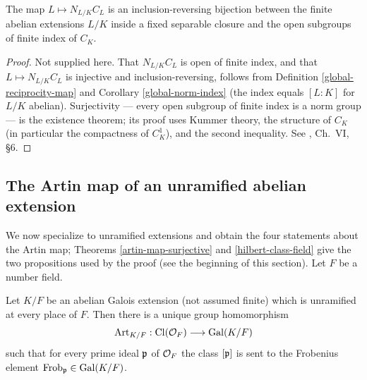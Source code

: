 \begin{thm}
\label{existence-theorem}
The map $L\mapsto N_{L/K}C_L$ is an inclusion-reversing bijection between the
finite abelian extensions $L/K$ inside a fixed separable closure and the open
subgroups of finite index of $C_K$.
\end{thm}

\begin{proof}
Not supplied here.
That $N_{L/K}C_L$ is open of finite index, and that $L\mapsto N_{L/K}C_L$ is
injective and inclusion-reversing, follows from
Definition \ref{global-reciprocity-map} and Corollary \ref{global-norm-index}
(the index equals $[L:K]$ for $L/K$ abelian).
Surjectivity --- every open subgroup of finite index is a norm group --- is the
existence theorem; its proof uses Kummer theory, the structure of $C_K$ (in
particular the compactness of $C_K^1$), and the second inequality.
See \cite{Neu99}, Ch.~VI, \S6.
\end{proof}

\subsection{The Artin map of an unramified abelian extension}

We now specialize to unramified extensions and obtain the four statements
about the Artin map; Theorems \ref{artin-map-surjective} and
\ref{hilbert-class-field} give the two propositions used by the {\Lean} proof
(see the beginning of this section).
Let $F$ be a number field.

\begin{thm}
\label{artin-map}
Let $K/F$ be an abelian Galois extension (not assumed finite) which is
unramified at every place of $F$.
Then there is a unique group homomorphism
$$\mathrm{Art}_{K/F}:{\mathrm{Cl}}({\mathcal {O}}_F)\longrightarrow{\mathrm{Gal}}(K/F)$$
such that for every prime ideal ${\mathfrak{p}}$ of ${\mathcal {O}}_F$ the class $[{\mathfrak{p}}]$ is sent to
the Frobenius element ${\mathrm{Frob}}_{\mathfrak{p}}\in{\mathrm{Gal}}(K/F)$.
\end{thm}

